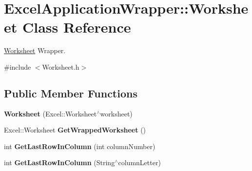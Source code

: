 \hypertarget{class_excel_application_wrapper_1_1_worksheet}{}\section{Excel\+Application\+Wrapper\+:\+:Worksheet Class Reference}
\label{class_excel_application_wrapper_1_1_worksheet}


\hyperlink{class_excel_application_wrapper_1_1_worksheet}{Worksheet} Wrapper.  




{\ttfamily \#include $<$Worksheet.\+h$>$}

\subsection*{Public Member Functions}
\begin{DoxyCompactItemize}
\item 
\hypertarget{class_excel_application_wrapper_1_1_worksheet_a8f7d02d051a99285fa40b19018c2d803}{}{\bfseries Worksheet} (Excel\+::\+Worksheet$^\wedge$worksheet)\label{class_excel_application_wrapper_1_1_worksheet_a8f7d02d051a99285fa40b19018c2d803}

\item 
\hypertarget{class_excel_application_wrapper_1_1_worksheet_a5cbfc6765710a9bdc1a4730a4cf5ba1d}{}Excel\+::\+Worksheet {\bfseries Get\+Wrapped\+Worksheet} ()\label{class_excel_application_wrapper_1_1_worksheet_a5cbfc6765710a9bdc1a4730a4cf5ba1d}

\item 
\hypertarget{class_excel_application_wrapper_1_1_worksheet_a62850cb7bd1cc320b24067f01d1aec89}{}int {\bfseries Get\+Last\+Row\+In\+Column} (int column\+Number)\label{class_excel_application_wrapper_1_1_worksheet_a62850cb7bd1cc320b24067f01d1aec89}

\item 
\hypertarget{class_excel_application_wrapper_1_1_worksheet_a61142684ad52c0825cfcaafba5fff259}{}int {\bfseries Get\+Last\+Row\+In\+Column} (String$^\wedge$column\+Letter)\label{class_excel_application_wrapper_1_1_worksheet_a61142684ad52c0825cfcaafba5fff259}

\end{DoxyCompactItemize}
